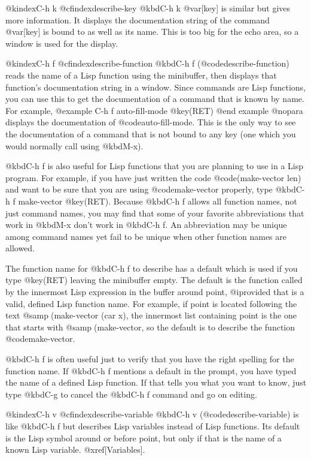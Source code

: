 {{{{@kindex{C-h k}
@cfindex{describe-key}
  @kbd{C-h k @var[key]} is similar but gives more information.  It displays
the documentation string of the command @var[key] is bound to as well as
its name.  This is too big for the echo area, so a window is used for the
display.

@kindex{C-h f}
@cfindex{describe-function}
  @kbd{C-h f} (@code{describe-function}) reads the name of a Lisp function
using the minibuffer, then displays that function's documentation string
in a window.  Since commands are Lisp functions, you can use this to get
the documentation of a command that is known by name.  For example,
@example
C-h f auto-fill-mode @key(RET)
@end example
@nopara
displays the documentation of @code{auto-fill-mode}.  This is the only
way to see the documentation of a command that is not bound to any key
(one which you would normally call using @kbd{M-x}).

  @kbd{C-h f} is also useful for Lisp functions that you are planning to
use in a Lisp program.  For example, if you have just written the code
@code{(make-vector len)} and want to be sure that you are using
@code{make-vector} properly, type @kbd{C-h f make-vector @key(RET)}.
Because @kbd{C-h f} allows all function names, not just command names,
you may find that some of your favorite abbreviations that work in @kbd{M-x}
don't work in @kbd{C-h f}.  An abbreviation may be unique among command names
yet fail to be unique when other function names are allowed.

  The function name for @kbd{C-h f} to describe has a default which is
used if you type @key(RET) leaving the minibuffer empty.  The default is
the function called by the innermost Lisp expression in the buffer around
point, @i{provided} that is a valid, defined Lisp function name.  For
example, if point is located following the text @samp{(make-vector (car
x)}, the innermost list containing point is the one that starts with
@samp{(make-vector}, so the default is to describe the function
@code{make-vector}.

  @kbd{C-h f} is often useful just to verify that you have the right
spelling for the function name.  If @kbd{C-h f} mentions a default in the
prompt, you have typed the name of a defined Lisp function.  If that tells
you what you want to know, just type @kbd{C-g} to cancel the @kbd{C-h f}
command and go on editing.

@kindex{C-h v}
@cfindex{describe-variable}
  @kbd{C-h v} (@code{describe-variable}) is like @kbd{C-h f} but describes
Lisp variables instead of Lisp functions.  Its default is the Lisp symbol
around or before point, but only if that is the name of a known Lisp
variable.  @xref[Variables].

}}}}
